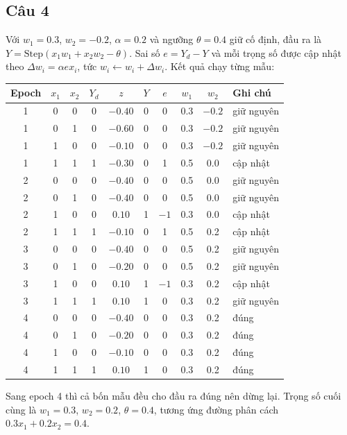 \documentclass[a4paper,12pt]{article}
\begin{document}
\subsection*{Câu 4}

Với $w_1 = 0.3$, $w_2 = -0.2$, $\alpha = 0.2$ và ngưỡng $\theta = 0.4$ giữ cố định, đầu ra là
$Y = \text{Step}(x_1w_1 + x_2w_2 - \theta)$. Sai số $e = Y_d - Y$ và mỗi trọng số được cập nhật
theo $\Delta w_i = \alpha e x_i$, tức $w_i \leftarrow w_i + \Delta w_i$. Kết quả chạy từng mẫu:

\begin{center}
\begin{tabular}{|c|c|c|c|c|c|c|c|c|l|}
\hline
Epoch & $x_1$ & $x_2$ & $Y_d$ & $z$ & $Y$ & $e$ & $w_1$ & $w_2$ & Ghi chú \\
\hline
1 & 0 & 0 & 0 & $-0.40$ & 0 & 0 & 0.3 & $-0.2$ & giữ nguyên \\
1 & 0 & 1 & 0 & $-0.60$ & 0 & 0 & 0.3 & $-0.2$ & giữ nguyên \\
1 & 1 & 0 & 0 & $-0.10$ & 0 & 0 & 0.3 & $-0.2$ & giữ nguyên \\
1 & 1 & 1 & 1 & $-0.30$ & 0 & 1 & 0.5 & 0.0 & cập nhật \\
\hline
2 & 0 & 0 & 0 & $-0.40$ & 0 & 0 & 0.5 & 0.0 & giữ nguyên \\
2 & 0 & 1 & 0 & $-0.40$ & 0 & 0 & 0.5 & 0.0 & giữ nguyên \\
2 & 1 & 0 & 0 & $0.10$ & 1 & $-1$ & 0.3 & 0.0 & cập nhật \\
2 & 1 & 1 & 1 & $-0.10$ & 0 & 1 & 0.5 & 0.2 & cập nhật \\
\hline
3 & 0 & 0 & 0 & $-0.40$ & 0 & 0 & 0.5 & 0.2 & giữ nguyên \\
3 & 0 & 1 & 0 & $-0.20$ & 0 & 0 & 0.5 & 0.2 & giữ nguyên \\
3 & 1 & 0 & 0 & $0.10$ & 1 & $-1$ & 0.3 & 0.2 & cập nhật \\
3 & 1 & 1 & 1 & $0.10$ & 1 & 0 & 0.3 & 0.2 & giữ nguyên \\
\hline
4 & 0 & 0 & 0 & $-0.40$ & 0 & 0 & 0.3 & 0.2 & đúng \\
4 & 0 & 1 & 0 & $-0.20$ & 0 & 0 & 0.3 & 0.2 & đúng \\
4 & 1 & 0 & 0 & $-0.10$ & 0 & 0 & 0.3 & 0.2 & đúng \\
4 & 1 & 1 & 1 & $0.10$ & 1 & 0 & 0.3 & 0.2 & đúng \\
\hline
\end{tabular}
\end{center}

Sang epoch 4 thì cả bốn mẫu đều cho đầu ra đúng nên dừng lại. Trọng số cuối cùng là
$w_1 = 0.3$, $w_2 = 0.2$, $\theta = 0.4$, tương ứng đường phân cách
$0.3x_1 + 0.2x_2 = 0.4$.
\end{document}
